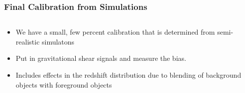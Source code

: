 \documentclass{beamer}
\begin{document}
\frame
{
    \frametitle{Final Calibration from Simulations}

    \begin{columns}
        \begin{column}{0.5\textwidth}    
            \begin{itemize}

                \item We have a small, few percent calibration that is determined
                    from semi-realistic simulatons

                \item Put in gravitational shear signals and measure the bias.

                \item Includes effects in the redshift distribution due to
                    blending of background objects with foreground objects

            \end{itemize}
        \end{column}
        \begin{column}{0.5\textwidth}
        \end{column}
    \end{columns}


}
\end{document}
